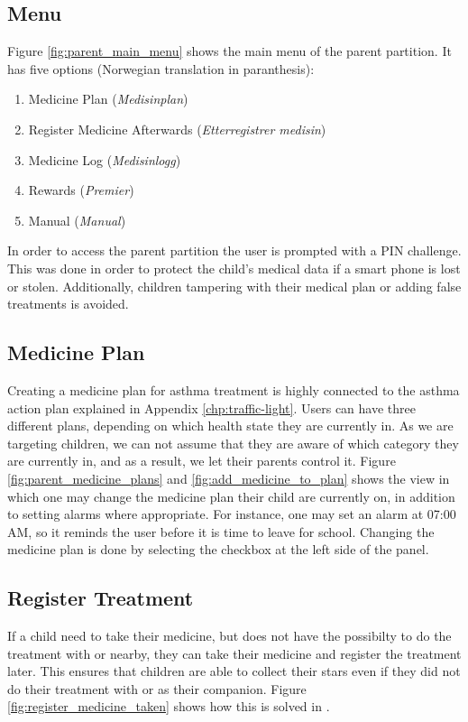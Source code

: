 \subsection{Menu}
\label{sec:description-menu}
Figure \ref{fig:parent_main_menu} shows the main menu of the parent partition. It has five options (Norwegian translation in paranthesis):
\begin{enumerate}
  \item Medicine Plan (\emph{Medisinplan})
  \item Register Medicine Afterwards (\emph{Etterregistrer medisin})
  \item Medicine Log (\emph{Medisinlogg})
  \item Rewards (\emph{Premier})
  \item Manual (\emph{Manual})
\end{enumerate} 

In order to access the parent partition the user is prompted with a PIN challenge. This was done in order to protect the child's medical data if a smart phone is lost or stolen. Additionally, children tampering with their medical plan or adding false treatments is avoided.

\subsection{Medicine Plan}
\label{sec:description-medicine-plan}
Creating a medicine plan for asthma treatment is highly connected to the asthma action plan explained in Appendix \ref{chp:traffic-light}.
Users can have three different plans, depending on which health state they are currently in. As we are targeting children, we can not assume that they are aware of which category they are currently in, and as a result, we let their parents control it. Figure \ref{fig:parent_medicine_plans} and \ref{fig:add_medicine_to_plan} shows the view in which one may change the medicine plan their child are currently on, in addition to setting alarms where appropriate. For instance, one may set an alarm at 07:00 AM, so it reminds the user before it is time to leave for school. Changing the medicine plan is done by selecting the checkbox at the left side of the panel.  


\subsection{Register Treatment}
\label{sec:description-register-medicine}

If a child need to take their medicine, but does not have the possibilty to do the treatment with \ab{} or \app{} nearby, they can take their medicine and register the treatment later. This ensures that children are able to collect their stars even if they did not do their treatment with \ab{} or \app{} as their companion. Figure \ref{fig:register_medicine_taken} shows how this is solved in \app{}.  

